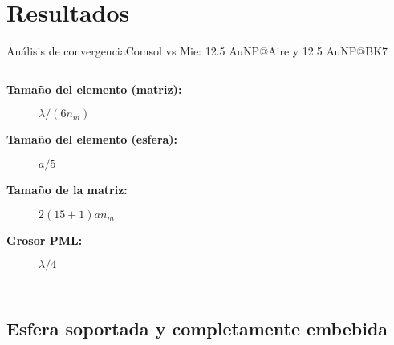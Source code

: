 

\section{Resultados}
    \begin{frame}{Análisis de convergencia}{Comsol vs Mie: 12.5 AuNP$@$Aire  y 12.5 AuNP$@$BK7}
    \begin{center}
        \begin{columns}
      \begin{description}
      \item[\textbf{Tamaño del elemento (matriz):}] $\lambda/(6 n_m)$
      \item[\textbf{Tamaño del elemento (esfera):}] $a/5$
      \item[\textbf{Tamaño de la matriz:}] $2(15+1)an_m$
      \item[\textbf{Grosor PML:}] $\lambda/4$
      \end{description}
        \centering\vspace*{-2em}
      \begin{figure}[h!]
        \def\svgwidth{1\textwidth}\footnotesize %
    \end{figure}
    \end{columns}
      \begin{figure}[h!]\scriptsize
        \def\svgwidth{.6\textwidth} %
    \end{figure}
    \end{center}
    \end{frame}
  \subsection{Esfera soportada y completamente embebida}

